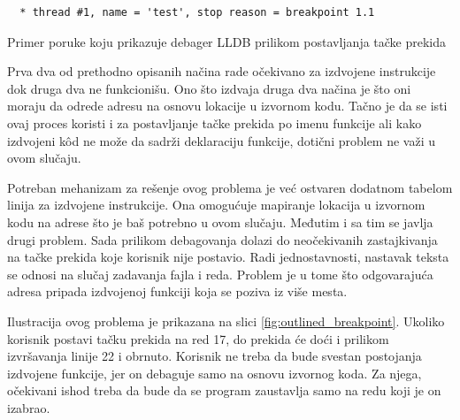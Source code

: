 \documentclass[12pt,oneside]{memoir}
\begin{document}
\begin{listing}[!ht]
\begin{verbatim}
  * thread #1, name = 'test', stop reason = breakpoint 1.1
\end{verbatim}
\caption{Primer poruke koju prikazuje debager LLDB prilikom postavljanja tačke prekida}
\label{lst:breakpoint_example}
\end{listing}

Prva dva od prethodno opisanih načina rade očekivano za izdvojene instrukcije dok druga dva ne funkcionišu.
Ono što izdvaja druga dva načina je što oni moraju da odrede adresu na osnovu lokacije u izvornom kodu.
Tačno je da se isti ovaj proces koristi i za postavljanje tačke prekida po imenu funkcije ali kako izdvojeni k\^od ne može da sadrži deklaraciju funkcije, dotični problem ne važi u ovom slučaju.

Potreban mehanizam za rešenje ovog problema je već ostvaren dodatnom tabelom linija za izdvojene instrukcije.
Ona omogućuje mapiranje lokacija u izvornom kodu na adrese što je baš potrebno u ovom slučaju.
Međutim i sa tim se javlja drugi problem.
Sada prilikom debagovanja dolazi do neočekivanih zastajkivanja na tačke prekida koje korisnik nije postavio.
Radi jednostavnosti, nastavak teksta se odnosi na slučaj zadavanja fajla i reda.
Problem je u tome što odgovarajuća adresa pripada izdvojenoj funkciji koja se poziva iz više mesta.

Ilustracija ovog problema je prikazana na slici \ref{fig:outlined_breakpoint}.
Ukoliko korisnik postavi tačku prekida na red 17, do prekida će doći i prilikom izvršavanja linije 22 i obrnuto.
Korisnik ne treba da bude svestan postojanja izdvojene funkcije, jer on debaguje samo na osnovu izvornog koda.
Za njega, očekivani ishod treba da bude da se program zaustavlja samo na redu koji je on izabrao.
\end{document}
